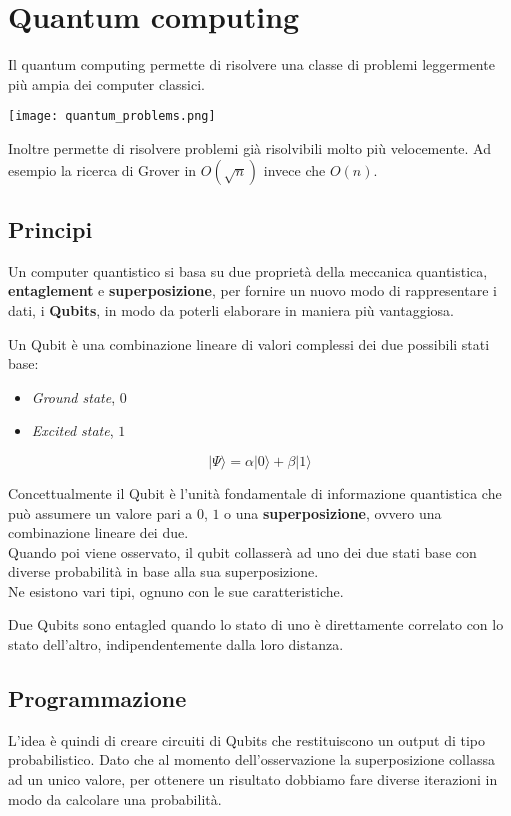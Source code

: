 \newpage
\section{Quantum computing}
Il quantum computing permette di risolvere una classe di problemi leggermente più ampia dei computer classici.
\begin{center}
	\texttt{[image: quantum\_problems.png]}
\end{center}
Inoltre permette di risolvere problemi già risolvibili molto più velocemente. Ad esempio la ricerca di Grover in $O(\sqrt{n})$ invece che $O(n)$.

\subsection{Principi}
Un computer quantistico si basa su due proprietà della meccanica quantistica, \textbf{entaglement} e \textbf{superposizione}, per fornire un nuovo modo di rappresentare i dati, i \textbf{Qubits}, in modo da poterli elaborare in maniera più vantaggiosa.
\begin{definition}[Qubit]
	Un Qubit è una combinazione lineare di valori complessi dei due possibili stati base:
	\begin{itemize}
		\item \textit{Ground state}, $0$
		\item \textit{Excited state}, $1$
	\end{itemize}
	\begin{equation}
		\lvert \Psi \rangle = \alpha \lvert 0 \rangle + \beta \lvert 1 \rangle
	\end{equation}
\end{definition}
Concettualmente il Qubit è l'unità fondamentale di informazione quantistica che può assumere un valore pari a $0$, $1$ o una \textbf{superposizione}, ovvero una combinazione lineare dei due.\\
Quando poi viene osservato, il qubit collasserà ad uno dei due stati base con diverse probabilità in base alla sua superposizione.\\
Ne esistono vari tipi, ognuno con le sue caratteristiche.

\begin{definition}[Entaglement]
	Due Qubits sono entagled quando lo stato di uno è direttamente correlato con lo stato dell'altro, indipendentemente dalla loro distanza.
\end{definition}
\subsection{Programmazione}
L'idea è quindi di creare circuiti di Qubits che restituiscono un output di tipo probabilistico. Dato che al momento dell'osservazione la superposizione collassa ad un unico valore, per ottenere un risultato dobbiamo fare diverse iterazioni in modo da calcolare una probabilità.
